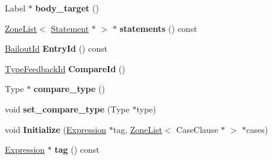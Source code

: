 \begin{DoxyCompactItemize}
\item 
\hypertarget{classv8_1_1internal_1_1_v8___f_i_n_a_l_ab2e565057097263354fa6bb16074696a}{}Label $\ast$ {\bfseries body\+\_\+target} ()\label{classv8_1_1internal_1_1_v8___f_i_n_a_l_ab2e565057097263354fa6bb16074696a}

\item 
\hypertarget{classv8_1_1internal_1_1_v8___f_i_n_a_l_ab469eac42efadb5366c3abf49a040df4}{}\hyperlink{classv8_1_1internal_1_1_zone_list}{Zone\+List}$<$ \hyperlink{classv8_1_1internal_1_1_statement}{Statement} $\ast$ $>$ $\ast$ {\bfseries statements} () const \label{classv8_1_1internal_1_1_v8___f_i_n_a_l_ab469eac42efadb5366c3abf49a040df4}

\item 
\hypertarget{classv8_1_1internal_1_1_v8___f_i_n_a_l_a16f7593ddcb39dc95b6cbf50fef256cb}{}\hyperlink{classv8_1_1internal_1_1_bailout_id}{Bailout\+Id} {\bfseries Entry\+Id} () const \label{classv8_1_1internal_1_1_v8___f_i_n_a_l_a16f7593ddcb39dc95b6cbf50fef256cb}

\item 
\hypertarget{classv8_1_1internal_1_1_v8___f_i_n_a_l_aa6ff1f7d98829f96a31136bbcd4232cc}{}\hyperlink{classv8_1_1internal_1_1_type_feedback_id}{Type\+Feedback\+Id} {\bfseries Compare\+Id} ()\label{classv8_1_1internal_1_1_v8___f_i_n_a_l_aa6ff1f7d98829f96a31136bbcd4232cc}

\item 
\hypertarget{classv8_1_1internal_1_1_v8___f_i_n_a_l_a62e7a9eb339020c8aaa38f84d59aeace}{}Type $\ast$ {\bfseries compare\+\_\+type} ()\label{classv8_1_1internal_1_1_v8___f_i_n_a_l_a62e7a9eb339020c8aaa38f84d59aeace}

\item 
\hypertarget{classv8_1_1internal_1_1_v8___f_i_n_a_l_aa778cb986c9299cbd2fdd859579468d6}{}void {\bfseries set\+\_\+compare\+\_\+type} (Type $\ast$type)\label{classv8_1_1internal_1_1_v8___f_i_n_a_l_aa778cb986c9299cbd2fdd859579468d6}

\item 
\hypertarget{classv8_1_1internal_1_1_v8___f_i_n_a_l_abc941ea001adc4b52d44d320fc77d570}{}void {\bfseries Initialize} (\hyperlink{classv8_1_1internal_1_1_expression}{Expression} $\ast$tag, \hyperlink{classv8_1_1internal_1_1_zone_list}{Zone\+List}$<$ Case\+Clause $\ast$ $>$ $\ast$cases)\label{classv8_1_1internal_1_1_v8___f_i_n_a_l_abc941ea001adc4b52d44d320fc77d570}

\item 
\hypertarget{classv8_1_1internal_1_1_v8___f_i_n_a_l_a8ba6018d5f5534fa3b917f059feb5581}{}\hyperlink{classv8_1_1internal_1_1_expression}{Expression} $\ast$ {\bfseries tag} () const \label{classv8_1_1internal_1_1_v8___f_i_n_a_l_a8ba6018d5f5534fa3b917f059feb5581}


\end{DoxyCompactItemize}
